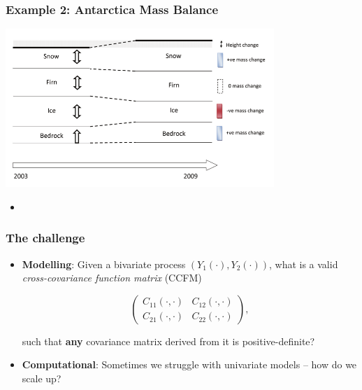 \documentclass{beamer}
\begin{document}

\begin{frame}
\frametitle{Example 2: Antarctica Mass Balance}

\begin{center}
\includegraphics[width=4in]{./Obs.png}        
\end{center}

\begin{itemize}
\item \citet{Zammit_2014,Zammit_2015a,Zammit_2015b}
\end{itemize}
\end{frame}


\begin{frame}
\frametitle{The challenge}

\begin{itemize}

\item {\bf Modelling}: Given a bivariate process $(Y_1(\cdot), Y_2(\cdot))$, what is a valid \emph{cross-covariance function matrix} (CCFM)
  
\begin{equation}
\left(\begin{array}{cc} C_{11}(\cdot,\cdot) & C_{12}(\cdot,\cdot) \\ C_{21}(\cdot,\cdot) & C_{22}(\cdot,\cdot)\end{array} \right),
\end{equation} 

such that {\bf any} covariance matrix derived from it is positive-definite? \vfill

\item {\bf Computational}: Sometimes we struggle with univariate models -- how do we scale up? \vfill
\end{itemize}
\end{frame}
\end{document}
